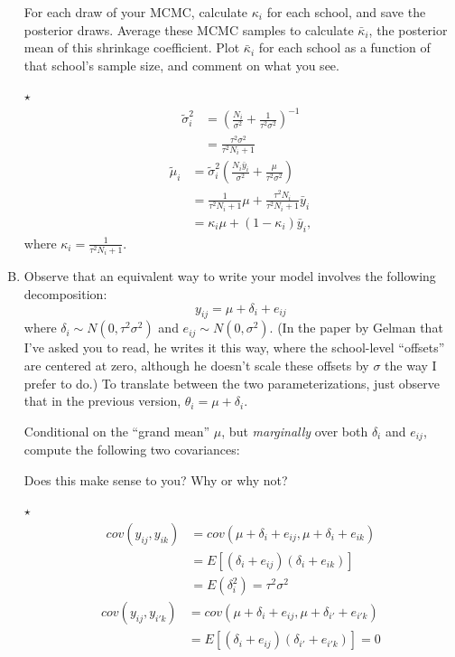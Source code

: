 \documentclass[11pt]{article}
\newcommand{\jie}{$\star$ }
\begin{document}
\begin{enumerate}[(A)]
For each draw of your MCMC, calculate $\kappa_i$ for each school, and save the posterior draws.  Average these MCMC samples to calculate $\bar{\kappa}_i$, the posterior mean of this shrinkage coefficient.   Plot $\bar{\kappa}_i$ for each school as a function of that school's sample size, and comment on what you see.  

\bigskip
\jie
\begin{align*}
    \tilde{\sigma}_i^2 &= (\frac{N_i}{\sigma^2} + \frac{1}{\tau^2 \sigma^2})^{-1} \\
    &= \frac{\tau^2 \sigma^2}{\tau^2 N_i + 1}
\end{align*}
\begin{align*}
    \tilde{\mu}_i &= \tilde{\sigma}_i^2 (\frac{N_i \bar{y}_i}{\sigma^2} + \frac{\mu}{\tau^2 \sigma^2}) \\
    &= \frac{1}{\tau^2 N_i + 1} \mu + \frac{\tau^2 N_i}{\tau^2 N_i + 1} \bar{y}_i \\
    &= \kappa_i \mu + (1-\kappa_i) \bar{y}_i,
\end{align*}
where $\kappa_i = \frac{1}{\tau^2 N_i + 1}$.

\item Observe that an equivalent way to write your model involves the following decomposition:  
$$
y_{ij} = \mu + \delta_i + e_{ij}
$$
where $\delta_i \sim N(0, \tau^2 \sigma^2)$ and $e_{ij} \sim N(0, \sigma^2)$.  (In the paper by Gelman that I've asked you to read, he writes it this way, where the school-level ``offsets'' are centered at zero, although he doesn't scale these offsets by $\sigma$ the way I prefer to do.)  To translate between the two parameterizations, just observe that in the previous version, $\theta_i = \mu + \delta_i$.  

Conditional on the ``grand mean'' $\mu$, but \emph{marginally} over both $\delta_i$ and $e_{ij}$, compute the following two covariances:


Does this make sense to you?  Why or why not?  

\bigskip
\jie
\begin{align*}
    cov(y_{ij}, y_{ik}) &= cov(\mu + \delta_i + e_{ij}, \mu + \delta_i + e_{ik}) \\
    &= E[(\delta_i + e_{ij})(\delta_i + e_{ik})] \\
    &= E(\delta_i^2) = \tau^2 \sigma^2
\end{align*}
\begin{align*}
    cov(y_{ij}, y_{i'k}) &= cov(\mu + \delta_i + e_{ij}, \mu + \delta_{i'} + e_{i'k}) \\
    &=E[(\delta_i + e_{ij})(\delta_{i'} + e_{i'k})] = 0
\end{align*}


\end{enumerate}
\end{document}
